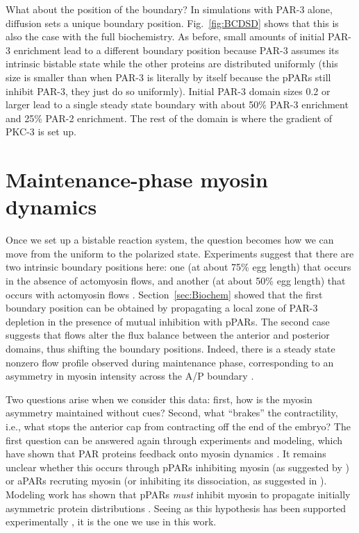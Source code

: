 \documentclass[11pt]{article}
\newcommand{\6}[1]{#1_{\text{6}}}
\newcommand{\3}[1]{#1_{\text{3}}}
\begin{document}
What about the position of the boundary? In simulations with PAR-3 alone, diffusion sets a unique boundary position. Fig.\ \ref{fig:BCDSD} shows that this is also the case with the full biochemistry. As before, small amounts of initial PAR-3 enrichment lead to a different boundary position because PAR-3 assumes its intrinsic bistable state while the other proteins are distributed uniformly (this size is smaller than when PAR-3 is literally by itself because the pPARs still inhibit PAR-3, they just do so uniformly). Initial PAR-3 domain sizes 0.2 or larger lead to a single steady state boundary with about 50\% PAR-3 enrichment and 25\% PAR-2 enrichment. The rest of the domain is where the gradient of PKC-3 is set up.



\section{Maintenance-phase myosin dynamics \label{sec:myosin}}
Once we set up a bistable reaction system, the question becomes how we can move from the uniform to the polarized state. Experiments suggest that there are two intrinsic boundary positions here: one (at about 75\% egg length) that occurs in the absence of actomyosin flows, and another (at about 50\% egg length) that occurs with actomyosin flows \cite{zonies2010symmetry}. Section\ \ref{sec:Biochem} showed that the first boundary position can be obtained by propagating a local zone of PAR-3 depletion in the presence of mutual inhibition with pPARs. The second case suggests that flows alter the flux balance between the anterior and posterior domains, thus shifting the boundary positions. Indeed, there is a steady state nonzero flow profile observed during maintenance phase, corresponding to an asymmetry in myosin intensity across the A/P boundary \cite{sailer2015dynamic}.

Two questions arise when we consider this data: first, how is the myosin asymmetry maintained without cues? Second, what ``brakes'' the contractility, i.e., what stops the anterior cap from contracting off the end of the embryo? The first question can be answered again through experiments and modeling, which have shown that PAR proteins feedback onto myosin dynamics \cite{gross2019guiding, beatty20132}. It remains unclear whether this occurs through pPARs inhibiting myosin (as suggested by \cite{beatty20132}) or aPARs recruting myosin (or inhibiting its dissociation, as suggested in \cite{gross2019guiding}). Modeling work has shown that pPARs \emph{must} inhibit myosin to propagate initially asymmetric protein distributions \cite{kravtsova2014actomyosin}. Seeing as this hypothesis has been supported experimentally \cite{munro2004cortical, beatty20132}, it is the one we use in this work.
\end{document}
